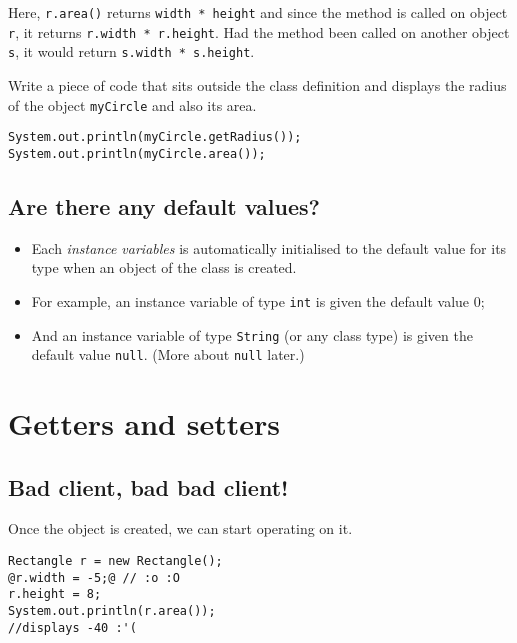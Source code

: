 \documentclass[abstracton]{scrartcl}
\begin{document}
  \vskip 0.5cm
  
  
  Here, \texttt{r.area()} returns \texttt{width * height} and since the method is called on object \texttt{r}, it returns \texttt{r.width * r.height}. Had the method been called on another object \texttt{s}, it would return \texttt{s.width * s.height}.
  
\begin{exercise}
Write a piece of code that sits outside the class definition and displays the radius of the object \texttt{myCircle} and also its area.
\end{exercise}
\begin{answer} \begin{lstlisting}
System.out.println(myCircle.getRadius());
System.out.println(myCircle.area());
\end{lstlisting} \end{answer}

\subsection{Are there any default values?}

    \begin{itemize}
    \item Each {\em instance variables}	
          is automatically initialised to the default value for its type when an object of
          the class is created. 
    \item For example, an instance variable
          of type \lstinline!int! is given the default value 0;
    \item And an instance variable
          of type \lstinline!String! (or any class type)
          is given the default value \lstinline!null!.
          (More about \lstinline!null! later.)
    \end{itemize}

\section{Getters and setters}
\subsection{Bad client, bad bad client!}

Once the object is created, we can start operating on it.
\begin{lstlisting}[style=buggy]
Rectangle r = new Rectangle();
@r.width = -5;@ // :o :O
r.height = 8;
System.out.println(r.area()); 
//displays -40 :'(
\end{lstlisting}
\end{document}
